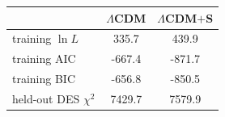 \begin{tabular}{lcc}
\toprule
 & $\Lambda$CDM & $\Lambda$CDM$+$S \\
\midrule
training $\ln L$ & 335.7 & 439.9 \\
training AIC & -667.4 & -871.7 \\
training BIC & -656.8 & -850.5 \\
held-out DES $\chi^2$ & 7429.7 & 7579.9 \\
\bottomrule
\end{tabular}
